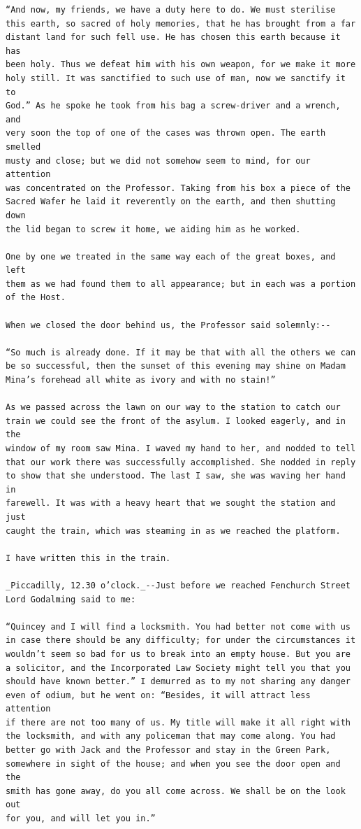 \documentclass{article}
\begin{document}
\begin{verbatim}
“And now, my friends, we have a duty here to do. We must sterilise
this earth, so sacred of holy memories, that he has brought from a far
distant land for such fell use. He has chosen this earth because it has
been holy. Thus we defeat him with his own weapon, for we make it more
holy still. It was sanctified to such use of man, now we sanctify it to
God.” As he spoke he took from his bag a screw-driver and a wrench, and
very soon the top of one of the cases was thrown open. The earth smelled
musty and close; but we did not somehow seem to mind, for our attention
was concentrated on the Professor. Taking from his box a piece of the
Sacred Wafer he laid it reverently on the earth, and then shutting down
the lid began to screw it home, we aiding him as he worked.

One by one we treated in the same way each of the great boxes, and left
them as we had found them to all appearance; but in each was a portion
of the Host.

When we closed the door behind us, the Professor said solemnly:--

“So much is already done. If it may be that with all the others we can
be so successful, then the sunset of this evening may shine on Madam
Mina’s forehead all white as ivory and with no stain!”

As we passed across the lawn on our way to the station to catch our
train we could see the front of the asylum. I looked eagerly, and in the
window of my room saw Mina. I waved my hand to her, and nodded to tell
that our work there was successfully accomplished. She nodded in reply
to show that she understood. The last I saw, she was waving her hand in
farewell. It was with a heavy heart that we sought the station and just
caught the train, which was steaming in as we reached the platform.

I have written this in the train.

_Piccadilly, 12.30 o’clock._--Just before we reached Fenchurch Street
Lord Godalming said to me:

“Quincey and I will find a locksmith. You had better not come with us
in case there should be any difficulty; for under the circumstances it
wouldn’t seem so bad for us to break into an empty house. But you are
a solicitor, and the Incorporated Law Society might tell you that you
should have known better.” I demurred as to my not sharing any danger
even of odium, but he went on: “Besides, it will attract less attention
if there are not too many of us. My title will make it all right with
the locksmith, and with any policeman that may come along. You had
better go with Jack and the Professor and stay in the Green Park,
somewhere in sight of the house; and when you see the door open and the
smith has gone away, do you all come across. We shall be on the look out
for you, and will let you in.”


\end{verbatim}
\end{document}
